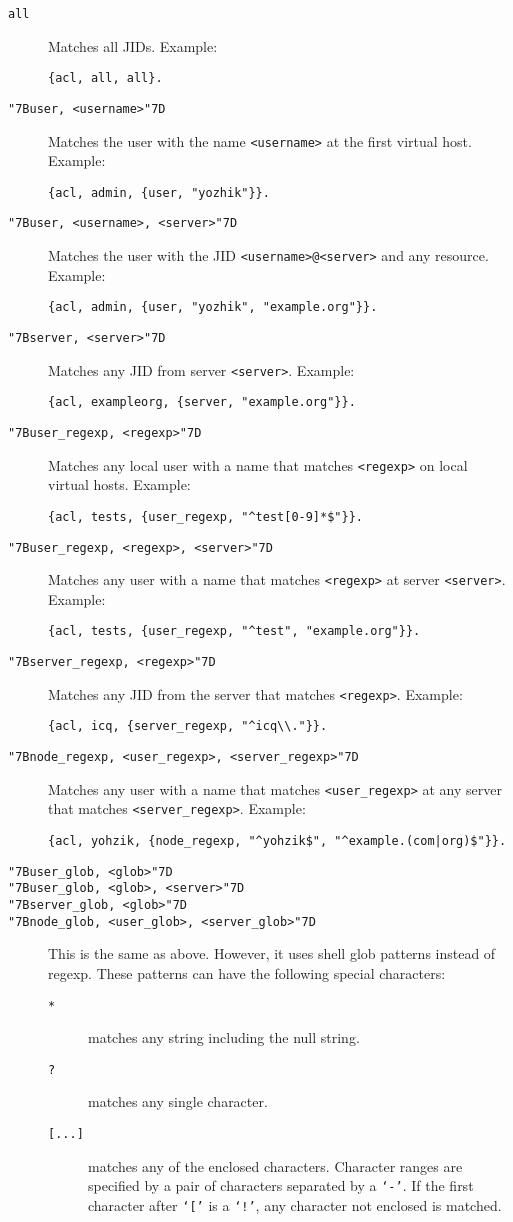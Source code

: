 \documentclass[a4paper,10pt]{book}
\newcommand{\bracehack}{\def\{{\char"7B}\def\}{\char"7D}}
\newcommand{\titem}[1]{\item[\bracehack\texttt{#1}]}
\newcommand{\term}[1]{\texttt{#1}}
\begin{document}
\begin{description}
\titem{all} Matches all JIDs. Example:
\begin{verbatim}
{acl, all, all}.
\end{verbatim}
\titem{\{user, <username>\}} Matches the user with the name
  \term{<username>} at the first virtual host. Example:
\begin{verbatim}
{acl, admin, {user, "yozhik"}}.
\end{verbatim}
\titem{\{user, <username>, <server>\}} Matches the user with the JID
  \term{<username>@<server>} and any resource. Example:
\begin{verbatim}
{acl, admin, {user, "yozhik", "example.org"}}.
\end{verbatim}
\titem{\{server, <server>\}} Matches any JID from server
  \term{<server>}. Example:
\begin{verbatim}
{acl, exampleorg, {server, "example.org"}}.
\end{verbatim}
\titem{\{user\_regexp, <regexp>\}} Matches any local user with a name that
  matches \term{<regexp>} on local virtual hosts. Example:
\begin{verbatim}
{acl, tests, {user_regexp, "^test[0-9]*$"}}.
\end{verbatim}
\titem{\{user\_regexp, <regexp>, <server>\}} Matches any user with a name
  that matches \term{<regexp>} at server \term{<server>}. Example:
\begin{verbatim}
{acl, tests, {user_regexp, "^test", "example.org"}}.
\end{verbatim}
\titem{\{server\_regexp, <regexp>\}} Matches any JID from the server that
  matches \term{<regexp>}. Example:
\begin{verbatim}
{acl, icq, {server_regexp, "^icq\\."}}.
\end{verbatim}
\titem{\{node\_regexp, <user\_regexp>, <server\_regexp>\}} Matches any user
  with a name that matches \term{<user\_regexp>} at any server that matches
  \term{<server\_regexp>}. Example:
\begin{verbatim}
{acl, yohzik, {node_regexp, "^yohzik$", "^example.(com|org)$"}}.
\end{verbatim}
\titem{\{user\_glob, <glob>\}}
\titem{\{user\_glob, <glob>, <server>\}}
\titem{\{server\_glob, <glob>\}}
\titem{\{node\_glob, <user\_glob>, <server\_glob>\}} This is the same as
  above. However, it uses shell glob patterns instead of regexp. These patterns
  can have the following special characters:
  \begin{description}
  \titem{*} matches any string including the null string.
  \titem{?} matches any single character.
  \titem{[...]} matches any of the enclosed characters. Character
    ranges are specified by a pair of characters separated by a \term{`-'}.
    If the first character after \term{`['} is a \term{`!'}, any
    character not enclosed is matched.
  \end{description}
\end{description}
\end{document}
